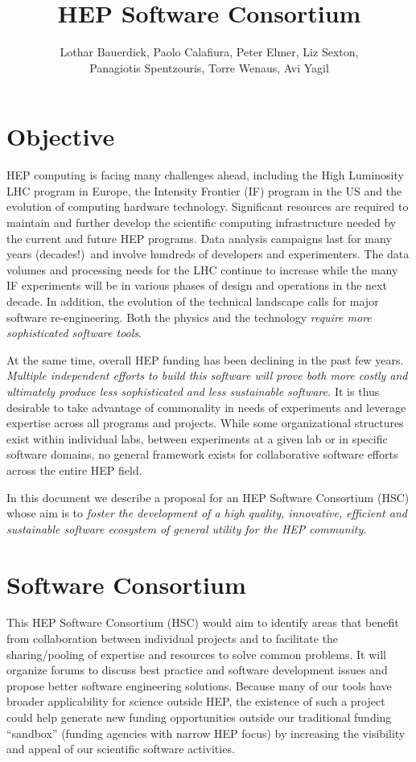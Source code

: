 \documentclass[12pt,letterpaper,fleqn]{article}
\author{Lothar Bauerdick, Paolo Calafiura, Peter Elmer, Liz Sexton, \\
Panagiotis Spentzouris, Torre Wenaus, Avi Yagil}
\title{HEP Software Consortium}
\begin{document}
\maketitle
\linenumbers

\section{Objective}
\label{sec:objective}


HEP computing is facing many challenges ahead, including the High
Luminosity LHC program in Europe, the Intensity Frontier (IF) program
in the US and the evolution of computing hardware technology.
Significant resources are required to maintain and further develop
the scientific computing infrastructure needed by the current and
future HEP programs.  Data analysis campaigns last for many years
(decades!)\ and involve hundreds of developers and experimenters.
The data volumes and processing needs for the LHC continue to
increase  while the many IF
experiments will be in various phases of design and operations in
the next decade.  In addition, the evolution of the technical
landscape calls for major software re-engineering. Both the
physics and the technology {\em require more sophisticated software
tools}.

At the same time, overall HEP funding has been declining in the past
few years. {\em Multiple independent efforts to build this software
will prove both more costly and ultimately produce less
sophisticated and less sustainable software.} It is thus
desirable to take advantage of commonality in
needs of experiments and leverage expertise across all programs and
projects. While some organizational structures exist within individual
labs, between experiments at a given lab or in specific software domains,
no general framework exists for collaborative software efforts across the entire HEP field.

In this document we describe a proposal for an HEP Software Consortium
(HSC) whose aim is to {\em foster the development of a high quality,
innovative, efficient and sustainable software ecosystem of general
utility for the HEP community.}





\section{Software Consortium}
\label{sec:consortium}

This HEP Software Consortium
(HSC) would aim to identify areas that benefit from collaboration
between individual projects and to facilitate the sharing/pooling
of expertise and resources to solve common problems.  It will
organize forums to discuss best practice and software development
issues and propose better software engineering solutions. 
Because many of our tools have broader applicability for science
outside HEP, the existence of such a project could help generate
new funding opportunities outside our traditional funding ``sandbox''
(funding agencies with narrow HEP focus) by increasing the visibility
and appeal of our scientific software activities.
\end{document}
